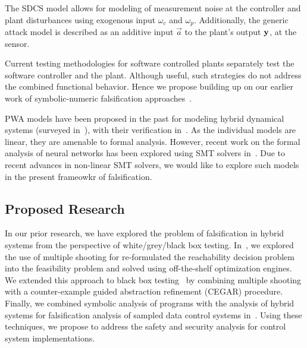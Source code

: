 The SDCS model allows for modeling of measurement noise at the
controller and plant disturbances using exogenous input $\omega_c$ and
$\omega_p$. Additionally, the generic attack model is described as an
additive input $\vec{a}$ to the plant's output $\mathbf{y}$, at the sensor.

Current testing methodologies for software controlled plants
separately test the software controller and the plant. Although
useful, such strategies do not address the combined functional
behavior. Hence we propose building up on our earlier work of
symbolic-numeric falsification approaches~\cite{zutshi2016symbolic}.

PWA models have been proposed in the past for modeling hybrid
dynamical systems (surveyed in~\cite{paoletti2007identification}),
with their verification in~\cite{yordanov2007model,
yordanov2010formal, koutsoukos2003safety, batt2007model}. As the
individual models are linear, they are amenable to formal analysis.
However, recent work on the formal analysis of neural networks has
been explored using SMT solvers in~\cite{pulina2012challenging,
pulina2011never, pulina2011checking, katz2017reluplex}. Due to recent
advances in non-linear SMT solvers, we would like to explore such
models in the present frameowkr of falsification.


\subsection{Proposed Research}

In our prior research, we have explored the problem of falsification
in hybrid systems from the perspective of white/grey/black box
testing. In~\cite{Zutshi+Others/2013/Trajectory}, we explored the use
of multiple shooting for re-formulated the reachability decision
problem into the feasibility problem and solved using off-the-shelf
optimization engines. We extended this approach to black box
testing~\cite{zutshi2014multiple} by combining multiple shooting with
a counter-example guided abstraction refinement (CEGAR) procedure.
Finally, we combined symbolic analysis of programs with the analysis
of hybrid systems for falsification analysis of sampled data control
systems in~\cite{zutshi2016symbolic}.
Using these techniques, we propose to address the safety and security
analysis for control system implementations.

